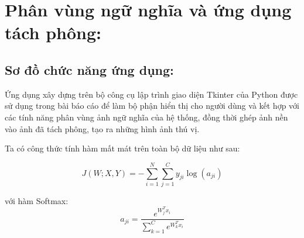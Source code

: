 \documentclass[../the.tex]{subfiles}
\begin{document}
\section{Phân vùng ngữ nghĩa và ứng dụng tách phông:}
\label{c3_main}

\subsection{Sơ đồ chức năng ứng dụng:}
\label{app_sche}
{\fontsize{13}{12} \selectfont
Ứng dụng xây dựng trên bộ công cụ lập trình giao diện Tkinter của Python được sử dụng trong bài báo cáo để làm bộ phận hiển thị cho người dùng và kết hợp với các tính năng phân vùng ảnh ngữ nghĩa của hệ thống, đồng thời ghép ảnh nền vào ảnh đã tách phông, tạo ra những hình ảnh thú vị.}
\bigskip
\bigskip

{\fontsize{13}{12} \selectfont
	Ta có công thức tính hàm mất mát trên toàn bộ dữ liệu như sau:
	\bigskip
	
	\begin{equation} \label{eq7}
		J(W;X,Y) = - \sum_{i=1}^{N} \sum_{j=1}^{C} y_{ji} \log (a_{ji})
	\end{equation}
	\bigskip
	
	với hàm Softmax: 
	\begin{equation} \label{eq7.2}
		a_{ji} = \frac{e^{W_j^{T} x_i}}{\sum_{k=1}^{C} e^{W_k^T x_i}}
	\end{equation}
	\bigskip
}
\end{document}
